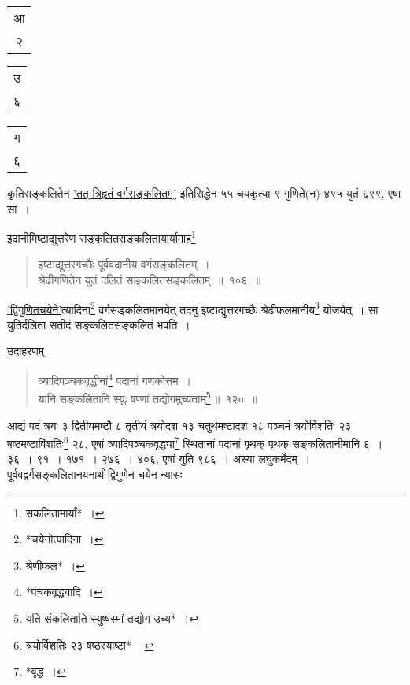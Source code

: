 \documentclass[10pt, openany]{book}
\begin{document}
{{{{{{{{{{{{{{\hspace{30mm} \begin{tabular}{|c|}आ \\२\\\hline \end{tabular}\begin{tabular}{c|}उ \\६\\\hline \end{tabular}\begin{tabular}{c|}ग\\६\\\hline \end{tabular}
\vspace{3mm}

{कृतिसङ्कलितेन \hyperref[102]{'तत् त्रिहृतं वर्गसङ्कलितम्'} इतिसिद्धेन ५५ चयकृत्या ९
गुणिते(न) ४९५ युतं}
{६९९, एषा सा~।}

\newpage

{इदानीमिष्टाद्युत्तरेण सङ्कलितसङ्कलितायार्यामाह\renewcommand{\thefootnote}{१}\footnote{सकलितामार्यां*~।}\textemdash

\begin{quote}
    
{\bs  इष्टाद्युत्तरगच्छैः पूर्ववदानीय वर्गसङ्कलितम्~। \\
 श्रेढीगणितेन युतं दलितं सङ्कलितसङ्कलितम्~॥~१०६~॥}\end{quote}

{\hyperref[105]{'द्विगुणितचयेने'}त्यादिना\renewcommand{\thefootnote}{२}\footnote{*चयेनोत्पादिना~।} वर्गसङ्कलितमानयेत् तदनु
इष्टाद्युत्तरगच्छैः श्रेढीफलमानीय\renewcommand{\thefootnote}{३}\footnote{श्रेणीफल*~।}
{योजयेत्~। सा युतिर्दलिता सतीदं सङ्कलितसङ्कलितं भवति~।}
\vspace{3mm}

{उदाहरणम्\textendash}

\begin{quote}
    
{\eg  त्र्यादिपञ्चकवृद्धीनां\renewcommand{\thefootnote}{४}\footnote{*पंचकवृद्ध्यादि~।} पदानां गणकोत्तम~।\\
 यानि सङ्कलितानि स्युः षण्णां तद्योगमुच्यताम्\renewcommand{\thefootnote}{५}\footnote{यति संकलिताति स्युष्षस्मां तद्योग उच्य*~।}\,॥~१२०~॥}\end{quote}

{आद्यं पदं त्रयः ३ द्वितीयमष्टौ ८ तृतीयं त्रयोदश १३ चतुर्थमष्टादश १८
पञ्चमं}
{त्रयोविंशतिः २३ षष्ठमष्टाविंशतिः\renewcommand{\thefootnote}{६}\footnote{त्रयोर्विशतिः २३
षष्ठस्याष्टा*~।} २८, एषां
त्र्यादिपञ्चकवृद्ध्या\renewcommand{\thefootnote}{७}\footnote{*वृद्ध~।} स्थितानां पदानां पृथक्}
{पृथक् सङ्कलितानीमानि ६~। ३६~। ९१~। १७१~। २७६~। ४०६, एषां युति ९८६~। 
अस्या}
{लघुकर्मेदम्~। पूर्ववद्वर्गसङ्कलितानयनार्थं द्विगुणेन चयेन न्यासः\textemdash}
\vspace{-1mm}

}}}}}}}}}}}}}}}}
\end{document}
